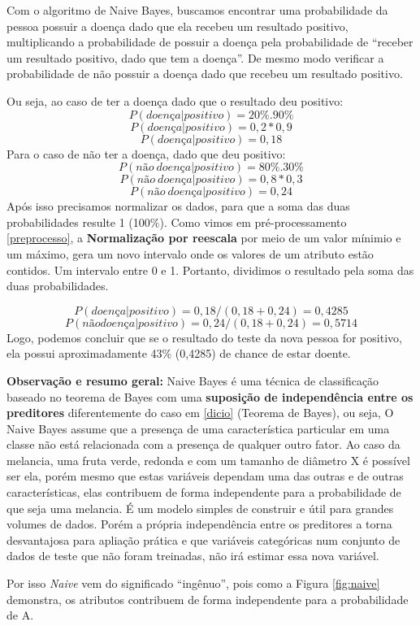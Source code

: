 \documentclass[
]{book}
\begin{document}
Com o algoritmo de Naive Bayes, buscamos encontrar uma probabilidade da pessoa possuir a doença dado que ela recebeu um resultado positivo, multiplicando a probabilidade de possuir a doença pela probabilidade de ``receber um resultado positivo, dado que tem a doença''. De mesmo modo verificar a probabilidade de não possuir a doença dado que recebeu um resultado positivo.

Ou seja, ao caso de ter a doença dado que o resultado deu positivo:
\[P(doença|positivo) = 20\% . 90\% \] \[P(doença|positivo) = 0,2 * 0,9 \] \[P(doença|positivo) = 0,18\]
Para o caso de não ter a doença, dado que deu positivo:
\[P(não \ doença|positivo) = 80\%.30\%\]
\[P(não \ doença|positivo) = 0,8 * 0,3\]
\[P(não\ doença|positivo) = 0,24\]
Após isso precisamos normalizar os dados, para que a soma das duas probabilidades resulte 1 (100\%). Como vimos em pré-processamento \ref{preprocesso}, a \textbf{Normalização por reescala} por meio de um valor mínimio e um máximo, gera um novo intervalo onde os valores de um atributo estão contidos. Um intervalo entre 0 e 1. Portanto, dividimos o resultado pela soma das duas probabilidades.

\[P(doença|positivo) = 0,18/(0,18+0,24) = 0,4285\]
\[P(não doença|positivo) = 0,24/(0,18+0,24) = 0,5714\]
Logo, podemos concluir que se o resultado do teste da nova pessoa for positivo, ela possui aproximadamente 43\% (0,4285) de chance de estar doente.

\textbf{Observação e resumo geral:} Naive Bayes é uma técnica de classificação baseado no teorema de Bayes com uma \textbf{suposição de independência entre os preditores} diferentemente do caso em \ref{dicio} (Teorema de Bayes), ou seja, O Naive Bayes assume que a presença de uma característica particular em uma classe não está relacionada com a presença de qualquer outro fator. Ao caso da melancia, uma fruta verde, redonda e com um tamanho de diâmetro X é possível ser ela, porém mesmo que estas variáveis dependam uma das outras e de outras características, elas contribuem de forma independente para a probabilidade de que seja uma melancia. É um modelo simples de construir e útil para grandes volumes de dados. Porém a própria independência entre os preditores a torna desvantajosa para apliação prática e que variáveis categóricas num conjunto de dados de teste que não foram treinadas, não irá estimar essa nova variável.

Por isso \emph{Naive} vem do significado ``ingênuo'', pois como a Figura \ref{fig:naive} demonstra, os atributos contribuem de forma independente para a probabilidade de A.
\end{document}
